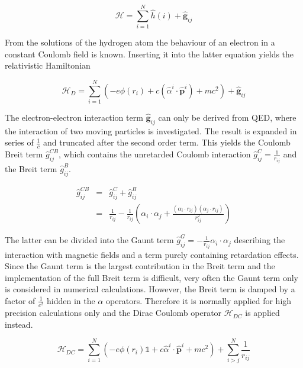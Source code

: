 \begin{equation}
\mathcal{H}= \sum\limits_{i=1}^N \hat{h}(i) + \mathbf{\hat{g}}_{ij}
\end{equation}

From the solutions of the hydrogen atom the behaviour of an electron in a constant
Coulomb field is known. Inserting it into the latter equation yields the
relativistic Hamiltonian

\begin{equation}
\mathcal{H}_{D}= \sum\limits_{i=1}^N (-e \phi(r_i)+c(\hat{\alpha}^{i}\cdot\hat{\mathbf{p}}^{i})+mc^2) + \mathbf{\hat{g}}_{ij}
\end{equation}

The electron-electron interaction term $\mathbf{\hat{g}}_{ij}$ can only be derived
from \ac{QED}, where the interaction of two moving particles is investigated.
The result is expanded in series of $\frac1c$ and truncated after the second
order term. This yields the Coulomb Breit term $\hat{g}_{ij}^{CB}$, which
contains the unretarded Coulomb interaction $\hat{g}_{ij}^C=\frac1{r_{ij}}$ and
the Breit term $\hat{g}_{ij}^B$.

\begin{equation}\begin{array}{rcl}
\hat{g}_{ij}^{CB} &=& \hat{g}_{ij}^C + \hat{g}_{ij}^B\\
                &=& \frac1{r_{ij}} - \frac1{r_{ij}}\left(\alpha_i\cdot\alpha_j+\frac{(\alpha_i\cdot r_{ij})(\alpha_j\cdot r_{ij})}{r^2_{ij}}\right)
\end{array}\end{equation}

The latter can be divided into the Gaunt term
$\hat{g}_{ij}^G = - \frac1{r_{ij}}\alpha_i\cdot\alpha_j$ describing the interaction
with magnetic fields and a term purely containing retardation effects.
Since the Gaunt term is the largest contribution in the Breit term and the
implementation of the full Breit term is difficult, very often the Gaunt term only
is considered in numerical calculations.
However, the Breit term is damped by a factor of $\frac 1{c^2}$ hidden in the
$\alpha$ operators. Therefore it is normally applied for high precision calculations
only and the Dirac Coulomb operator $\mathcal{H}_{DC}$ is applied instead.

\begin{equation}\label{DCHamil}
\mathcal{H}_{DC} = \sum\limits_{i=1}^N (-e \phi(r_i)\mathds{1}+c\hat{\alpha}^{i}\cdot\hat{\mathbf{p}}^{i}+mc^2) + \sum\limits_{i>j}^N \frac1{r_{ij}}
\end{equation}


